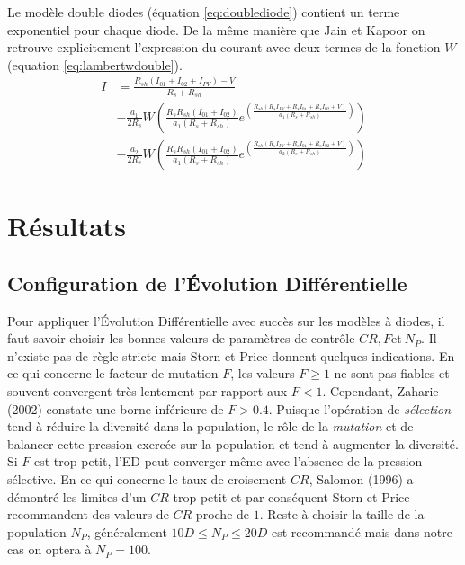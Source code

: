 Le modèle double diodes (équation \ref{eq:doublediode}) contient un terme exponentiel pour chaque diode. De la même manière que Jain et Kapoor on retrouve explicitement l'expression du courant avec deux termes de la fonction $W$ (equation \ref{eq:lambertwdouble}).
\begin{equation}
  \label{eq:lambertwdouble}
  \begin{split}
    I &= \frac{R_{sh} (I_{01} + I_{02} + I_{PV}) - V}{R_s + R_{sh}}\\ 
    &- \frac{a_1}{2 R_s} W\left( \frac{R_s R_{sh}(I_{01} + I_{02})}{a_1 (R_s + R_{sh})}e^{\left(\frac{R_{sh}(R_s I_{PV} + R_s I_{01} + R_s I_{02} + V)}{a_1 (R_s + R_{sh})}\right)}\right)\\ 
    &- \frac{a_2}{2 R_s} W\left( \frac{R_s R_{sh}(I_{01} + I_{02})}{a_1 (R_s + R_{sh})}e^{\left(\frac{R_{sh}(R_s I_{PV} + R_s I_{01} + R_s I_{02} + V)}{a_2 (R_s + R_{sh})}\right)}\right)
  \end{split}
\end{equation}

\section{Résultats}

\subsection{Configuration de l'Évolution Différentielle}
Pour appliquer l'Évolution Différentielle avec succès sur les modèles à diodes, il faut savoir choisir les bonnes valeurs de paramètres de contrôle $CR, F \text{et}\  N_P$. Il n'existe pas de règle stricte mais Storn et Price \cite{Price2005} donnent quelques indications. En ce qui concerne le facteur de mutation $F$, les valeurs $F \geq 1$ ne sont pas fiables et souvent convergent très lentement par rapport aux $F < 1$. Cependant, Zaharie (2002) \cite{Zaharie2002} constate une borne inférieure de $F > 0.4$. Puisque l'opération de \textit{sélection} tend à réduire la diversité dans la population, le rôle de la \textit{mutation} et de balancer cette pression exercée sur la population et tend à augmenter la diversité. Si $F$ est trop petit, l'ED peut converger même avec l'absence de la pression sélective. En ce qui concerne le taux de croisement $CR$, Salomon (1996) \cite{Salomon1996} a démontré les limites d'un $CR$ trop petit et par conséquent Storn et Price recommandent des valeurs de $CR$ proche de $1$. Reste à choisir la taille de la population $N_P$, généralement $10D \leq N_P \leq 20D$ est recommandé mais dans notre cas on optera à $N_P = 100$.

